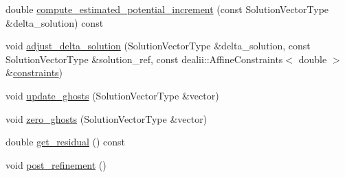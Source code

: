 \begin{DoxyCompactItemize}
double \hyperlink{classincremental_f_e_1_1_f_e_model_aa8f82250544410e43abf4812565bfc20}{compute\+\_\+estimated\+\_\+potential\+\_\+increment} (const Solution\+Vector\+Type \&delta\+\_\+solution) const 
\item 
void \hyperlink{classincremental_f_e_1_1_f_e_model_a3fcdba85d0abaca07655c094da98a497}{adjust\+\_\+delta\+\_\+solution} (Solution\+Vector\+Type \&delta\+\_\+solution, const Solution\+Vector\+Type \&solution\+\_\+ref, const dealii\+::\+Affine\+Constraints$<$ double $>$ \&\hyperlink{classincremental_f_e_1_1_f_e_model_a33a622c3c53ea4bee3bdefac06201c70}{constraints})
\item 
void \hyperlink{classincremental_f_e_1_1_f_e_model_a5ecf05b93871cc936364d85d990c80e0}{update\+\_\+ghosts} (Solution\+Vector\+Type \&vector)
\item 
void \hyperlink{classincremental_f_e_1_1_f_e_model_a0eb2401c8fde4bea7ed93527ee0e5f8a}{zero\+\_\+ghosts} (Solution\+Vector\+Type \&vector)
\item 
double \hyperlink{classincremental_f_e_1_1_f_e_model_abef0d6e47e00fb6b502d1b21cecc1766}{get\+\_\+residual} () const 
\item 
void \hyperlink{classincremental_f_e_1_1_f_e_model_ae06daeaed072ca50f43eccec359b3da3}{post\+\_\+refinement} ()
\end{DoxyCompactItemize}
